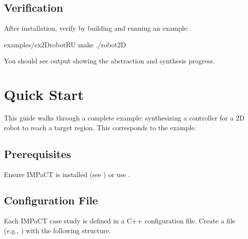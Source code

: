 \documentclass[a4paper,10pt,english]{sphinxmanual}
\begin{document}
\subsection{Verification}
\label{\detokenize{getting-started/installation:verification}}
\sphinxAtStartPar
After installation, verify by building and running an example:

\begin{sphinxVerbatim}[commandchars=\\\{\}]
examples/ex\PYGZus{}2Drobot\PYGZhy{}R\PYGZhy{}U
make
./robot2D
\end{sphinxVerbatim}

\sphinxAtStartPar
You should see output showing the abstraction and synthesis progress.

\sphinxstepscope


\section{Quick Start}
\label{\detokenize{getting-started/quickstart:quick-start}}\label{\detokenize{getting-started/quickstart::doc}}
\sphinxAtStartPar
This guide walks through a complete example: synthesizing a controller for a 2D robot
to reach a target region. This corresponds to the  example.


\subsection{Prerequisites}
\label{\detokenize{getting-started/quickstart:prerequisites}}
\sphinxAtStartPar
Ensure IMPaCT is installed (see {\hyperref[\detokenize{getting-started/installation::doc}]{}}) or use {\hyperref[\detokenize{getting-started/docker::doc}]{}}.


\subsection{Configuration File}
\label{\detokenize{getting-started/quickstart:configuration-file}}
\sphinxAtStartPar
Each IMPaCT case study is defined in a C++ configuration file. Create a file
(e.g., ) with the following structure.

\sphinxAtStartPar
{}
\end{document}
